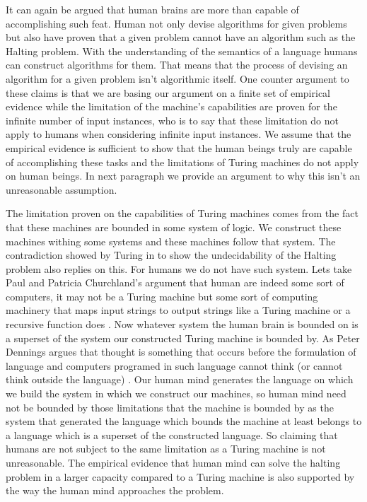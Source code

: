 \documentclass[11pt,a4paper]{article}
\begin{document}
It can again be argued that human brains are more than capable of accomplishing such feat. Human not only devise algorithms for given problems but also have proven that a given problem cannot have an algorithm such as the Halting problem. 
With the understanding of the semantics of a language humans can construct algorithms for them. That means that the process of devising an algorithm for a given problem isn't algorithmic itself.
One counter argument to these claims is that we are basing our argument on a finite set of empirical evidence while the limitation of the machine's capabilities are proven for the infinite number of input instances, who is to say that these limitation do not apply to humans when considering infinite input instances.
We assume that the empirical evidence is sufficient to show that the human beings truly are capable of accomplishing these tasks and the limitations of Turing machines do not apply on human beings.
In next paragraph we provide an argument to why this isn't an unreasonable assumption.
\\\par\vspace*{0.5cm}
The limitation proven on the capabilities of Turing machines comes from the fact that these machines are bounded in some system of logic. 
We construct these machines withing some systems and these machines follow that system. The contradiction showed by Turing in \cite{Turing36} to show the undecidability of the Halting problem also replies on this.
For humans we do not have such system. Lets take Paul and Patricia Churchland's argument that human are indeed some sort of computers, it may not be a Turing machine but some sort of computing machinery that maps input strings to output strings like a Turing machine or a recursive function does \cite{Churchland}. 
Now whatever system the human brain is bounded on is a superset of the system our constructed Turing machine is bounded by. As Peter Dennings argues that thought is something that occurs before the formulation of language and computers programed in such language cannot think (or cannot think outside the language) \cite{Denning}.
Our human mind generates the language on which we build the system in which we construct our machines, so human mind need not be bounded by those limitations that the machine is bounded by as the system that generated the language which bounds the machine at least belongs to a language which is a superset of the constructed language.
So claiming that humans are not subject to the same limitation as a Turing machine is not unreasonable. The empirical evidence that human mind can solve the halting problem in a larger capacity compared to a Turing machine is also supported by the way the human mind approaches the problem. 
\end{document}

